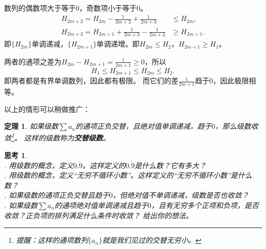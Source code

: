 \documentclass[12pt,UTF8]{ctexbook}
\newtheorem{tm}{定理}[section]
\newtheorem{sk}{思考}[section]
\begin{document}
数列的偶数项大于等于$0$，奇数项小于等于$0$。
\begin{align*}
    H_{2m+2} = H_{2m} - \frac{1}{2m+2} + \frac{1}{2m+3} &\leqslant H_{2m},  \\
    H_{2m+3} = H_{2m+1} + \frac{1}{2m+3} - \frac{1}{2m+4} &\geqslant H_{2m+1}. 
\end{align*}
即$\{H_{2m}\}$单调递减，$\{H_{2m+1}\}$单调递增。即$H_{2m} \leqslant H_2 $，$H_{2m+1} \geqslant H_1$。

两者的通项之差为$ H_{2m} - H_{2m+1} = \frac{1}{2m+1} \geqslant 0$，所以
$$ H_1 \leqslant H_{2m+1} \leqslant H_{2m} \leqslant H_2. $$
即两者都是有界单调数列，因此都有极限。
而它们的差$\frac{1}{2m+1}$趋于$0$，因此极限相等。

以上的情形可以稍做推广：
\begin{tm}
    如果级数$\sum a_n$的通项正负交替，且绝对值单调递减，趋于$0$，那么级数收敛\footnote{提醒：这样的通项数列$\{a_n\}$就是我们见过的交替无穷小。}。
    这样的级数称为\textbf{交替级数}。
\end{tm}

\begin{sk}
    \mbox{} \\
    . 用级数的概念，定义$0.\dot{9}$。这样定义的$0.\dot{9}$是什么数？它有多大？\\
    . 用级数的概念，定义“无穷不循环小数”。这样定义的“无穷不循环小数”是什么数？\\
    . 如果级数的通项正负交替且趋于$0$，但绝对值不单调递减，级数是否也收敛？\\
    . 如果级数$\sum a_n$的通项绝对值单调递减且趋于$0$，且有无穷多个正项和负项，是否收敛？正负项的排列满足什么条件时收敛？
    给出你的想法。
    
\end{sk}
\end{document}
